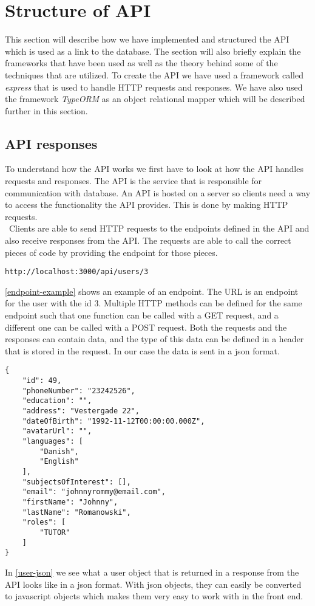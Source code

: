 \section{Structure of API}
This section will describe how we have implemented and structured the API which is used as a link to the database.
The section will also briefly explain the frameworks that have been used as well as the theory behind some of the techniques that are utilized.
To create the API we have used a framework called \textit{express} that is used to handle HTTP requests and responses.
We have also used the framework \textit{TypeORM} as an object relational mapper which will be described further in this section.

\subsection{API responses}
To understand how the API works we first have to look at how the API handles requests and responses.
The API is the service that is responsible for communication with database. 
An API is hosted on a server so clients need a way to access the functionality the API provides.
This is done by making HTTP requests. 
\\\
Clients are able to send HTTP requests to the endpoints defined in the API and also receive responses from the API.
The requests are able to call the correct pieces of code by providing the endpoint for those pieces.
\begin{center}\label{endpoint-example}
    \texttt{http://localhost:3000/api/users/3}
\end{center}
\autoref{endpoint-example} shows an example of an endpoint.
The URL is an endpoint for the user with the id 3.
Multiple HTTP methods can be defined for the same endpoint such that one function can be called with a GET request, and a different one can be called with a POST request. 
Both the requests and the responses can contain data, and the type of this data can be defined in a header that is stored in the request.
In our case the data is sent in a json format.
\begin{lstlisting}[caption={Shows how a user object looks in a json format}, captionpos=b, label={user-json}]
{
    "id": 49,
    "phoneNumber": "23242526",
    "education": "",
    "address": "Vestergade 22",
    "dateOfBirth": "1992-11-12T00:00:00.000Z",
    "avatarUrl": "",
    "languages": [
        "Danish",
        "English"
    ],
    "subjectsOfInterest": [],
    "email": "johnnyrommy@email.com",
    "firstName": "Johnny",
    "lastName": "Romanowski",
    "roles": [
        "TUTOR"
    ]
}
\end{lstlisting}
In \autoref{user-json} we see what a user object that is returned in a response from the API looks like in a json format. 
With json objects, they can easily be converted to javascript objects which makes them very easy to work with in the front end. 
